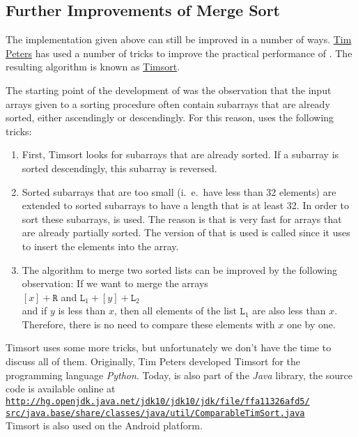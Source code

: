 \subsection{Further Improvements of Merge Sort}
The implementation given above can still be improved in a number of ways.  
\href{http://c2.com/cgi/wiki?TimPeters}{Tim Peters} has used a number of tricks to improve the
practical performance of .  The resulting algorithm is known as
\href{http://en.wikipedia.org/wiki/Timsort}{Timsort}.

The starting point of the development of  was the observation that the input arrays 
given to a sorting procedure often contain subarrays that are already sorted, either ascendingly or
descendingly.   For this reason,  uses the following tricks:
\begin{enumerate}
\item First, Timsort looks for subarrays that are already sorted.
      If a subarray is sorted descendingly, this subarray is reversed.
\item Sorted subarrays that are too small (i.~e.~have less than 32 elements) are extended
      to sorted subarrays to have a length that is at least 32.  In order to sort these subarrays,
       is used.  The reason is that  is very fast for
      arrays that are already partially sorted.  The version of  that is used is called
       since it uses 
      \href{http://en.wikipedia.org/wiki/Binary_search}{} to insert the elements
      into the array.
\item The algorithm to merge two sorted lists can be improved by the following observation: If we
      want to merge the arrays
      \\[0.2cm]
      \hspace*{1.3cm}
      $[x] + \mathtt{R}$ \quad and \quad $\mathtt{L}_1 + [y] + \mathtt{L}_2$
      \\[0.2cm]
      and if $y$ is less than $x$, then all elements of the list $\mathtt{L}_1$ are also less than $x$.
      Therefore, there is no need to compare these elements with $x$ one by one.  
\end{enumerate}
Timsort uses some more tricks, but unfortunately we don't have the time to discuss all of them.
Originally, Tim Peters developed Timsort for the programming language \textsl{Python}.  Today,
 is also part of the \textsl{Java} library, the source code is available online at
\\[0.2cm]
\hspace*{0.3cm}
\href{http://hg.openjdk.java.net/jdk10/jdk10/jdk/file/ffa11326afd5/src/java.base/share/classes/java/util/ComparableTimSort.java}{\texttt{http://hg.openjdk.java.net/jdk10/jdk10/jdk/file/ffa11326afd5/\\
\hspace*{1.5cm}
    src/java.base/share/classes/java/util/ComparableTimSort.java}}
\\[0.2cm]
Timsort is also used on the Android platform.

